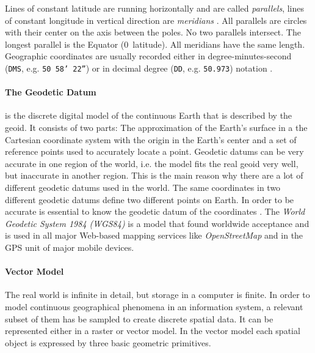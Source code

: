 Lines of constant latitude are running horizontally and are called \emph{parallels}, lines of constant longitude in vertical direction are \emph{meridians} . All parallels are circles with their center on the axis between the poles. No two parallels intersect. The longest parallel is the Equator (0\degree~latitude). All meridians have the same length. Geographic coordinates are usually recorded either in degree-minutes-second (\texttt{DMS}, e.g. \texttt{50\degree~58' 22''}) or in decimal degree (\texttt{DD}, e.g. \texttt{50.973}) notation
\cite[pp. 30, 79]{bolstad2008gis}.


\paragraph{The Geodetic Datum} %
\label{par:geodetic_datum}

is the discrete digital model of the continuous Earth that is described by the geoid. It consists of two parts: The approximation of the Earth's surface in a the Cartesian coordinate system with the origin in the Earth's center and a set of reference points used to accurately locate a point. Geodetic datums can be very accurate in one region of the world, i.e. the model fits the real geoid very well, but inaccurate in another region. This is the main reason why there are a lot of different geodetic datums used in the world. The same coordinates in two different geodetic datums define two different points on Earth. In order to be accurate is essential to know the geodetic datum of the coordinates
\cite[p. 80]{bolstad2008gis}.
The \emph{World Geodetic System 1984 (WGS84)} is a model that found worldwide acceptance and is used in all major Web-based mapping services like \emph{OpenStreetMap} and in the GPS unit of major mobile devices.


\paragraph{Vector Model} %
\label{ssub:vector_model}

The real world is infinite in detail, but storage in a computer is finite. In order to model continuous geographical phenomena in an information system, a relevant subset of them has be sampled to create discrete spatial data. It can be represented either in a raster or vector model. In the vector model each spatial object is expressed by three basic geometric primitives.

